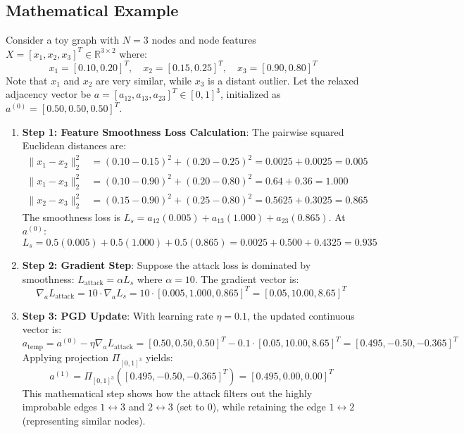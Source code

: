 \documentclass{article}
\begin{document}
\subsection{Mathematical Example}
Consider a toy graph with $N=3$ nodes and node features $X = [x_1, x_2, x_3]^T \in \mathbb{R}^{3 \times 2}$ where:
$$x_1 = [0.10, 0.20]^T, \quad x_2 = [0.15, 0.25]^T, \quad x_3 = [0.90, 0.80]^T$$
Note that $x_1$ and $x_2$ are very similar, while $x_3$ is a distant outlier. Let the relaxed adjacency vector be $a = [a_{12}, a_{13}, a_{23}]^T \in [0, 1]^3$, initialized as $a^{(0)} = [0.50, 0.50, 0.50]^T$.

\begin{enumerate}
    \item \textbf{Step 1: Feature Smoothness Loss Calculation}: The pairwise squared Euclidean distances are:
    \begin{align*}
        \|x_1 - x_2\|_2^2 &= (0.10-0.15)^2 + (0.20-0.25)^2 = 0.0025 + 0.0025 = 0.005 \\
        \|x_1 - x_3\|_2^2 &= (0.10-0.90)^2 + (0.20-0.80)^2 = 0.64 + 0.36 = 1.000 \\
        \|x_2 - x_3\|_2^2 &= (0.15-0.90)^2 + (0.25-0.80)^2 = 0.5625 + 0.3025 = 0.865
    \end{align*}
    The smoothness loss is $L_s = a_{12} (0.005) + a_{13} (1.000) + a_{23} (0.865)$. At $a^{(0)}$:
    $$L_s = 0.5(0.005) + 0.5(1.000) + 0.5(0.865) = 0.0025 + 0.500 + 0.4325 = 0.935$$
    
    \item \textbf{Step 2: Gradient Step}: Suppose the attack loss is dominated by smoothness: $L_{\text{attack}} = \alpha L_s$ where $\alpha = 10$. The gradient vector is:
    $$\nabla_a L_{\text{attack}} = 10 \cdot \nabla_a L_s = 10 \cdot [0.005, 1.000, 0.865]^T = [0.05, 10.00, 8.65]^T$$
    
    \item \textbf{Step 3: PGD Update}: With learning rate $\eta = 0.1$, the updated continuous vector is:
    $$a_{\text{temp}} = a^{(0)} - \eta \nabla_a L_{\text{attack}} = [0.50, 0.50, 0.50]^T - 0.1 \cdot [0.05, 10.00, 8.65]^T = [0.495, -0.50, -0.365]^T$$
    Applying projection $\Pi_{[0, 1]^3}$ yields:
    $$a^{(1)} = \Pi_{[0, 1]^3}([0.495, -0.50, -0.365]^T) = [0.495, 0.00, 0.00]^T$$
    This mathematical step shows how the attack filters out the highly improbable edges $1\leftrightarrow 3$ and $2\leftrightarrow 3$ (set to 0), while retaining the edge $1\leftrightarrow 2$ (representing similar nodes).
\end{enumerate}
\end{document}
